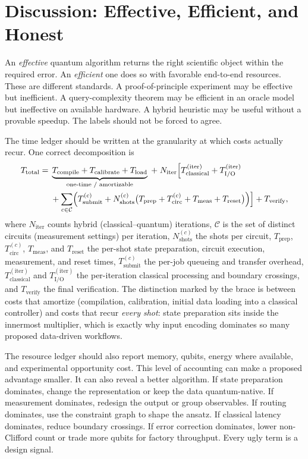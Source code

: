 \section{Discussion: Effective, Efficient, and Honest}\label{sec:discussion}

An \emph{effective} quantum algorithm returns the right scientific object within the required error. An \emph{efficient} one does so with favorable end-to-end resources. These are different standards. A proof-of-principle experiment may be effective but inefficient. A query-complexity theorem may be efficient in an oracle model but ineffective on available hardware. A hybrid heuristic may be useful without a provable speedup. The labels should not be forced to agree.

The time ledger should be written at the granularity at which costs actually recur. One correct decomposition is
\begin{align}
T_{\mathrm{total}}={}&\underbrace{T_{\mathrm{compile}}+T_{\mathrm{calibrate}}+T_{\mathrm{load}}}_{\text{one-time / amortizable}}
\;+\;N_{\mathrm{iter}}\Bigl[T_{\mathrm{classical}}^{(\mathrm{iter})}+T_{\mathrm{I/O}}^{(\mathrm{iter})}\Bigr.\notag\\
&\Bigl.{}+\sum_{c\in\mathcal{C}}\Bigl(T_{\mathrm{submit}}^{(c)}
+N_{\mathrm{shots}}^{(c)}\bigl(T_{\mathrm{prep}}+T_{\mathrm{circ}}^{(c)}+T_{\mathrm{meas}}+T_{\mathrm{reset}}\bigr)\Bigr)\Bigr]
+T_{\mathrm{verify}},
\label{eq:complete-ledger}
\end{align}
where $N_{\mathrm{iter}}$ counts hybrid (classical--quantum) iterations, $\mathcal{C}$ is the set of distinct circuits (measurement settings) per iteration, $N_{\mathrm{shots}}^{(c)}$ the shots per circuit, $T_{\mathrm{prep}}$, $T_{\mathrm{circ}}^{(c)}$, $T_{\mathrm{meas}}$, and $T_{\mathrm{reset}}$ the per-shot state preparation, circuit execution, measurement, and reset times, $T_{\mathrm{submit}}^{(c)}$ the per-job queueing and transfer overhead, $T_{\mathrm{classical}}^{(\mathrm{iter})}$ and $T_{\mathrm{I/O}}^{(\mathrm{iter})}$ the per-iteration classical processing and boundary crossings, and $T_{\mathrm{verify}}$ the final verification. The distinction marked by the brace is between costs that amortize (compilation, calibration, initial data loading into a classical controller) and costs that recur \emph{every shot}: state preparation sits inside the innermost multiplier, which is exactly why input encoding dominates so many proposed data-driven workflows.

The resource ledger should also report memory, qubits, energy where available, and experimental opportunity cost. This level of accounting can make a proposed advantage smaller. It can also reveal a better algorithm. If state preparation dominates, change the representation or keep the data quantum-native. If measurement dominates, redesign the output or group observables. If routing dominates, use the constraint graph to shape the ansatz. If classical latency dominates, reduce boundary crossings. If error correction dominates, lower non-Clifford count or trade more qubits for factory throughput. Every ugly term is a design signal.

